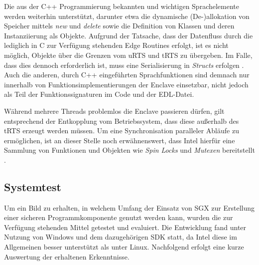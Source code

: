 Die aus der C++ Programmierung bekannten und wichtigen Sprachelemente werden weiterhin unterstützt, darunter etwa die dynamische (De-)allokation von Speicher mittels \textit{new} und \textit{delete} sowie die Definition von Klassen und deren Instanziierung als Objekte. Aufgrund der Tatsache, dass der Datenfluss durch die lediglich in C zur Verfügung stehenden Edge Routines erfolgt, ist es nicht möglich, Objekte über die Grenzen vom \ac{uRTS} und \ac{tRTS} zu übergeben. Im Falle, dass dies dennoch erforderlich ist, muss eine Serialisierung in \textit{Structs} erfolgen \cite{LinuxGuide}. Auch die anderen, durch C++ eingeführten Sprachfunktionen sind demnach nur innerhalb von Funktionsimplementierungen der Enclave einsetzbar, nicht jedoch als Teil der Funktionssignaturen im Code und der \ac{EDL}-Datei.

Während mehrere Threads problemlos die Enclave passieren dürfen, gilt entsprechend der Entkopplung vom Betriebssystem, dass diese außerhalb des \ac{tRTS} erzeugt werden müssen. Um eine Synchronisation paralleler Abläufe zu ermöglichen, ist an dieser Stelle noch erwähnenswert, dass Intel hierfür eine Sammlung von Funktionen und Objekten wie \textit{Spin Locks} und \textit{Mutexen} bereitstellt \cite{LinuxGuide}.

\subsection{Systemtest}

Um ein Bild zu erhalten, in welchem Umfang der Einsatz von \ac{SGX} zur Erstellung einer sicheren Programmkomponente genutzt werden kann, wurden die zur Verfügung stehenden Mittel getestet und evaluiert. Die Entwicklung fand unter Nutzung von Windows und dem dazugehörigen \ac{SDK} statt, da Intel diese im Allgemeinen besser unterstützt als unter Linux. Nachfolgend erfolgt eine kurze Auswertung der erhaltenen Erkenntnisse.


